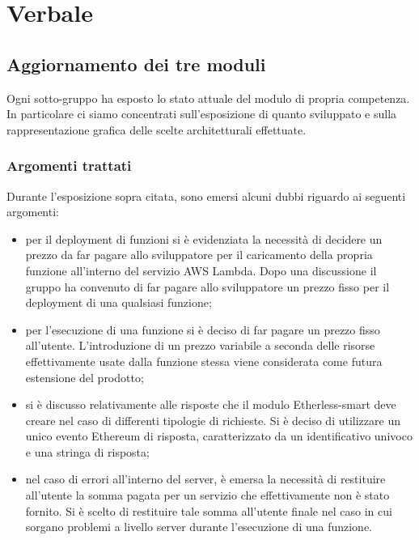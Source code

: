 \section{Verbale}
	\subsection{Aggiornamento dei tre moduli}
		Ogni sotto-gruppo ha esposto lo stato attuale del modulo\textit{} di propria competenza.	In particolare ci siamo concentrati sull'esposizione di quanto sviluppato e sulla rappresentazione grafica delle scelte architetturali effettuate.
		
		\subsubsection{Argomenti trattati}
			Durante l'esposizione sopra citata, sono emersi alcuni dubbi riguardo ai seguenti argomenti:
			\begin{itemize}
				\item per il deployment di funzioni si è evidenziata la necessità di decidere un prezzo da far pagare allo sviluppatore per il caricamento della propria funzione all'interno del servizio AWS Lambda. Dopo una discussione il gruppo ha convenuto di far pagare allo sviluppatore un prezzo fisso per il deployment di una qualsiasi funzione;
				\item per l'esecuzione di una funzione si è deciso di far pagare un prezzo fisso all'utente. L'introduzione di un prezzo variabile a seconda delle risorse effettivamente usate dalla funzione stessa viene considerata come futura estensione del prodotto; 
				\item si è discusso relativamente alle risposte che il modulo Etherless-smart deve creare nel caso di differenti tipologie di richieste. Si è deciso di utilizzare un unico evento Ethereum di risposta, caratterizzato da un identificativo univoco e una stringa di risposta;
				\item nel caso di errori all'interno del server, è emersa la necessità di restituire all'utente la somma pagata per un servizio che effettivamente non è stato fornito. Si è scelto di restituire tale somma all'utente finale nel caso in cui sorgano problemi a livello server durante l'esecuzione di una funzione.
			\end{itemize}
		
